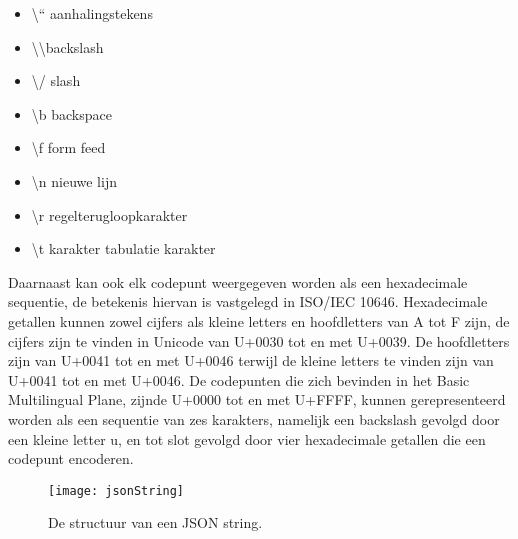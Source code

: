 \begin{itemize}
    \item \textbackslash “  aanhalingstekens
    \item \textbackslash \textbackslash \space backslash
    \item \textbackslash  / slash
    \item \textbackslash b backspace
    \item \textbackslash f form feed
    \item \textbackslash n nieuwe lijn
    \item \textbackslash r regelterugloopkarakter
    \item \textbackslash t karakter tabulatie karakter                 
\end{itemize}

Daarnaast kan ook elk codepunt weergegeven worden als een hexadecimale sequentie, de betekenis hiervan is vastgelegd in ISO/IEC 10646. Hexadecimale getallen kunnen zowel cijfers als kleine letters en hoofdletters van A tot F zijn, de cijfers zijn te vinden in Unicode van U+0030 tot en met U+0039. De hoofdletters zijn van U+0041 tot en met U+0046 terwijl de kleine letters te vinden zijn van U+0041 tot en met U+0046.
De codepunten die zich bevinden in het Basic Multilingual Plane, zijnde U+0000 tot en met U+FFFF, kunnen gerepresenteerd worden als een sequentie van zes karakters, namelijk een backslash gevolgd door een kleine letter u, en tot slot gevolgd door vier hexadecimale getallen die een codepunt encoderen.

\begin{figure}[h]
    \centering
    \texttt{[image: jsonString]}
    \caption[JSON String]{De structuur van een JSON string.}
    \label{fig:jsonString}
\end{figure}




